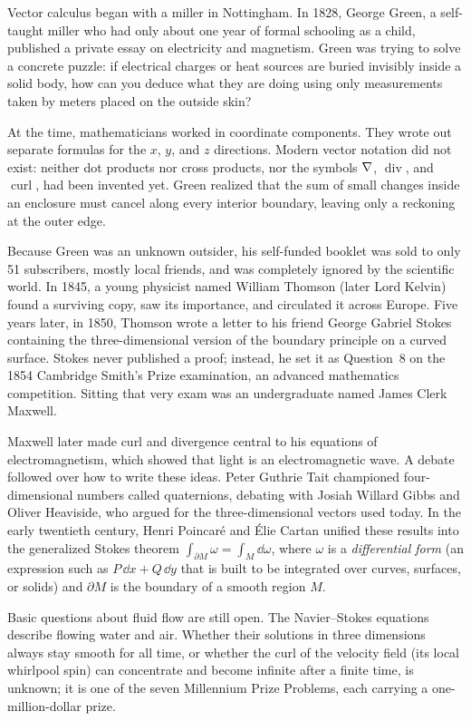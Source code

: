\begin{historybox}
Vector calculus began with a miller in Nottingham. In 1828, George Green, a
self-taught miller who had only about one year of formal schooling as a child,
published a private essay on electricity and magnetism. Green was trying to solve a concrete puzzle: if electrical charges or
heat sources are buried invisibly inside a solid body, how can you deduce what they
are doing using only measurements taken by meters placed on the outside skin?

At the time, mathematicians worked in coordinate components. They wrote
out separate formulas for the $x$, $y$, and $z$ directions. Modern vector
notation did not exist: neither dot products nor cross products, nor the symbols
$\nabla$, $\operatorname{div}$, and $\operatorname{curl}$, had been invented yet. Green
realized that the sum of small changes inside an enclosure must cancel along
every interior boundary, leaving only a reckoning at the outer edge.

Because Green was an unknown outsider, his self-funded booklet was sold to only 51
subscribers, mostly local friends, and was completely ignored by the scientific
world. In 1845, a young physicist named William
Thomson (later Lord Kelvin) found a surviving copy, saw its
importance, and circulated it across Europe. Five years later, in 1850, Thomson wrote a
letter to his friend George Gabriel Stokes containing the three-dimensional version
of the boundary principle on a curved surface. Stokes never published a proof; instead,
he set it as Question~8 on the 1854 Cambridge Smith's Prize examination, an advanced
mathematics competition. Sitting that very exam was an undergraduate named James Clerk
Maxwell.

Maxwell later made curl and divergence central to his
equations of electromagnetism, which showed that light is an
electromagnetic wave. A debate followed over how to write these
ideas. Peter Guthrie Tait championed four-dimensional numbers called quaternions,
debating with Josiah Willard Gibbs and Oliver Heaviside,
who argued for the three-dimensional vectors used today.
In the early twentieth century, Henri Poincar\'e and \'Elie Cartan unified these results into
the generalized Stokes theorem $\int_{\partial M}\omega = \int_M \dd\omega$,
where $\omega$ is a \emph{differential form} (an expression such as $P\,\dd x + Q\,\dd y$
that is built to be integrated over curves, surfaces, or solids)
and $\partial M$ is the boundary of a smooth region $M$.

Basic questions about fluid flow are still open. The Navier--Stokes equations
describe flowing water and air. Whether their solutions in three dimensions always
stay smooth for all time, or whether the curl of the velocity field (its local
whirlpool spin) can concentrate and become infinite after a finite time, is
unknown; it is one of the seven Millennium Prize Problems, each carrying a
one-million-dollar prize.
\end{historybox}

